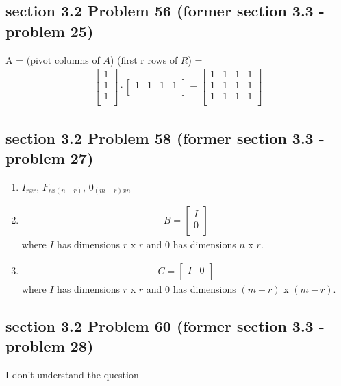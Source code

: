 \documentclass[a4paper,11pt]{article}
\begin{document}
\subsection*{section 3.2 Problem 56 (former section 3.3 - problem 25)} 
A = (pivot columns of $A$) (first r rows of $R$) = 
\begin{align}
\begin{bmatrix}
1 \\
1 \\
1 \\
\end{bmatrix}
\cdot
\begin{bmatrix}
1 & 1 & 1 & 1 \\
\end{bmatrix}
=
\begin{bmatrix}
1 & 1 & 1 & 1 \\
1 & 1 & 1 & 1 \\
1 & 1 & 1 & 1 \\
\end{bmatrix}
\end{align}
\subsection*{section 3.2 Problem 58 (former section 3.3 - problem 27)} 
\begin{enumerate}[label=\alph*]
\item $I_{rxr}$, $F_{rx(n-r)}$, $0_{(m-r)xn}$
\item 
\begin{align*}
B = 
\begin{bmatrix}
I \\
0 \\
\end{bmatrix}
\end{align*}
where $I$ has dimensions $r$ x $r$ and $0$ has dimensions $n$ x $r$.
\item 
\begin{align*}
C = 
\begin{bmatrix}
I & 0\\
\end{bmatrix}
\end{align*}
where $I$ has dimensions $r$ x $r$ and $0$ has dimensions $(m-r)$ x $(m-r)$.
\end{enumerate}
\subsection*{section 3.2 Problem 60 (former section 3.3 - problem 28)} 
I don't understand the question
\end{document}
